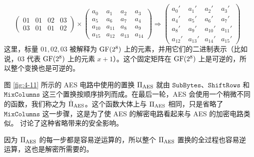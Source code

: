 \begin{snote}
\begin{enumerate}
\begin{equation}
\begin{pmatrix}
    		01 & 01 & 02 & 03\\
    		03 & 01 & 01 & 02
    	\end{pmatrix}
    	\times
    	\begin{pmatrix}
    		a_0 & a_1 & a_2 & a_3\\
    		a_5 & a_6 & a_7 & a_4\\
    		a_{10} & a_{11} & a_{8} & a_{9}\\
    		a_{15} & a_{12} & a_{13} & a_{14}
    	\end{pmatrix}
    	\Longrightarrow
    	\begin{pmatrix}
    		a_0' & a_1' & a_2' & a_3'\\
    		a_4' & a_5' & a_6' & a_7'\\
    		a_8' & a_9' & a_{10}' & a_{11}'\\
    		a_{12}' & a_{13}' & a_{14}' & a_{15}'
    	\end{pmatrix}
    \end{equation}
    这里，标量 $01,02,03$ 被解释为 ${\rm GF}(2^8)$ 上的元素，并用它们的二进制表示（比如说，$03$ 代表 ${\rm GF}(2^8)$ 上的元素 $x+1$）。这个固定矩阵在 ${\rm GF}(2^8)$ 上是可逆的，所以整个变换也是可逆的。
\end{enumerate}

图 \ref{fig:4-11} 所示的 AES 电路中使用的置换 $\Pi_{\rm AES}$ 就由 $\mathtt{SubBytes}$、$\mathtt{ShiftRows}$ 和 $\mathtt{MixColumns}$ 这三个置换按顺序排列而成。在最后一轮，AES 会使用一个稍微不同的函数，我们称之为 $\hat\Pi_{\rm AES}$。这个函数大体上与 $\Pi_{\rm AES}$ 相同，只是省略了 $\mathtt{MixColumns}$ 这一步骤，这是为了使 AES 的解密电路看起来与 AES 的加密电路类似。\cite{dunkelman2010effects} 讨论了这种省略带来的安全影响。

因为 $\Pi_{\rm AES}$ 的每一步都是容易逆运算的，所以整个 $\Pi_{\rm AES}$ 置换的全过程也容易逆运算，这也是解密所需要的。
\end{snote}

